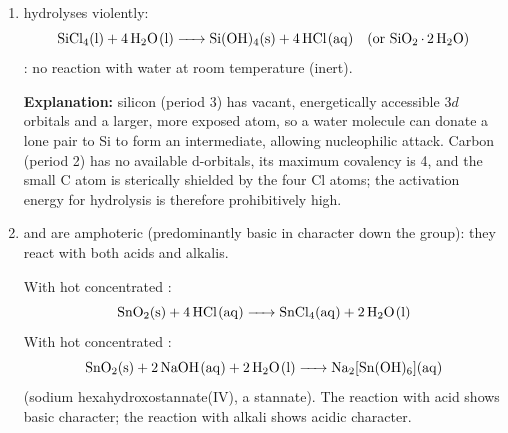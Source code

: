 \documentclass[11pt]{article}
\newcommand{\cle}[1]{{\popxbold\color{popdark}#1}}
\begin{document}
\begin{corrige}
\begin{enumerate}
\item \textbf{} hydrolyses violently:
\[
\ce{SiCl4(l) + 4H2O(l) -> Si(OH)4(s) + 4HCl(aq)} \quad \text{(or } \ce{SiO2.2H2O}\text{)}
\]
\textbf{}: no reaction with water at room temperature (inert).

\textbf{Explanation:} silicon (period 3) has vacant, energetically accessible $3d$ orbitals and a larger, more exposed atom, so a water molecule can donate a lone pair to Si to form an intermediate, allowing nucleophilic attack. Carbon (period 2) has no available d-orbitals, its maximum covalency is 4, and the small C atom is sterically shielded by the four Cl atoms; the activation energy for hydrolysis is therefore prohibitively high.

\item {} and  are \cle{amphoteric} (predominantly basic in character down the group): they react with both acids and alkalis.

With hot concentrated :
\[
\ce{SnO2(s) + 4HCl(aq) -> SnCl4(aq) + 2H2O(l)}
\]
With hot concentrated :
\[
\ce{SnO2(s) + 2NaOH(aq) + 2H2O(l) -> Na2[Sn(OH)6](aq)}
\]
(sodium hexahydroxostannate(IV), a stannate). The reaction with acid shows basic character; the reaction with alkali shows acidic character.
\end{enumerate}
\end{corrige}
\end{document}
